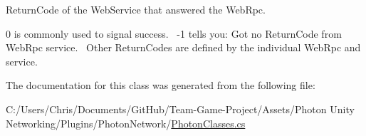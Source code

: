 Return\+Code of the Web\+Service that answered the Web\+Rpc. 

0 is commonly used to signal success.~\newline
 -\/1 tells you\+: Got no Return\+Code from Web\+Rpc service.~\newline
 Other Return\+Codes are defined by the individual Web\+Rpc and service. 

The documentation for this class was generated from the following file\+:\begin{DoxyCompactItemize}
\item 
C\+:/\+Users/\+Chris/\+Documents/\+Git\+Hub/\+Team-\/\+Game-\/\+Project/\+Assets/\+Photon Unity Networking/\+Plugins/\+Photon\+Network/\hyperlink{_photon_classes_8cs}{Photon\+Classes.\+cs}\end{DoxyCompactItemize}

